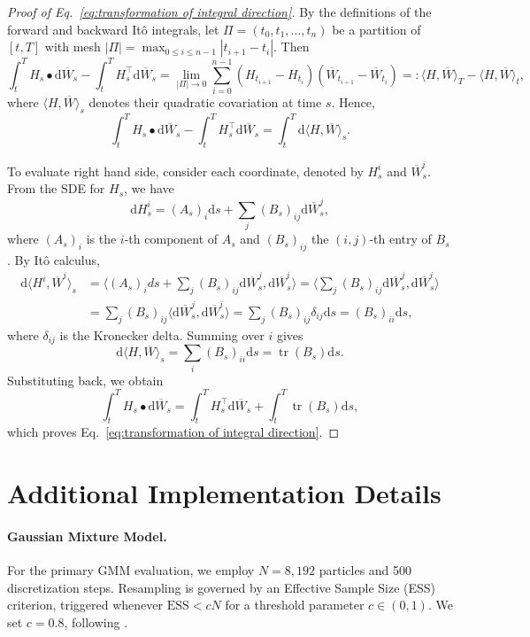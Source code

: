 \documentclass{article}
\theoremstyle{plain}
\theoremstyle{definition}
\theoremstyle{remark}
\newcommand{\dif}{{\mathrm{d}}}
\begin{document}
\begin{proof}[Proof of Eq.~\eqref{eq:transformation of integral direction}]
By the definitions of the forward and backward Itô integrals, let \(\Pi=(t_0,t_1,\ldots,t_n)\) be a partition of \([t,T]\) with mesh \(|\Pi|=\max_{0\le i\le n-1}|t_{i+1}-t_i|\). Then
\[
\int_t^T H_s\bullet \dif \overline W_s-\int_t^T H_s^\top \dif \overline W_s
=\lim_{|\Pi|\to 0}\sum_{i=0}^{n-1}(H_{t_{i+1}}-H_{t_i})(\overline W_{t_{i+1}}-\overline W_{t_i})
=:\langle H,\overline W\rangle_T-\langle H,\overline W\rangle_t,
\]
where \(\langle H,\overline W\rangle_s\) denotes their quadratic covariation at time \(s\).
Hence,
\[
\int_t^T H_s\bullet \dif \overline W_s - \int_t^T H_s^\top \dif \overline W_s
= \int_t^T \dif \langle H, \overline W\rangle_s.
\]

To evaluate right hand side, consider each coordinate, denoted by $H_s^i$ and $\overline W_s^i$.  
From the SDE for $H_s$, we have
\[
\dif H_s^i = (A_s)_i \dif s + \sum_j (B_s)_{ij} \dif \overline W_s^j,
\]
where $(A_s)_i$ is the $i$-th component of $A_s$ and $(B_s)_{ij}$ the $(i,j)$-th entry of $B_s$. By Itô calculus,
\begin{align*}
\dif \langle H^i, \overline W^i\rangle_s
&= \Big\langle (A_s)_i ds + \sum_j (B_s)_{ij} \dif \overline W_s^j, \dif \overline W_s^i \Big\rangle
= \Big\langle \sum_j (B_s)_{ij} \dif \overline W_s^j, \dif \overline W_s^i \Big\rangle \\
&= \sum_j (B_s)_{ij} \langle \dif \overline W_s^j, \dif \overline W_s^i \rangle
= \sum_j (B_s)_{ij} \delta_{ij} \dif s
= (B_s)_{ii} \dif s,
\end{align*}
where $\delta_{ij}$ is the Kronecker delta. Summing over $i$ gives
\[
\dif \langle H, \overline W\rangle_s = \sum_i (B_s)_{ii} \dif s = \operatorname{tr}(B_s) \dif s.
\]
Substituting back, we obtain
\[
\int_t^T H_s\bullet \dif \overline W_s
= \int_t^T H_s^\top \dif \overline W_s + \int_t^T \operatorname{tr}(B_s) \dif s,
\]
which proves Eq.~\eqref{eq:transformation of integral direction}.
\end{proof}

\section{Additional Implementation Details}
\label{additional_set}

\paragraph{Gaussian Mixture Model.} For the primary GMM evaluation, we employ $N=8,192$ particles and 500 discretization steps. Resampling is governed by an Effective Sample Size (ESS) criterion, triggered whenever $\mathrm{ESS} < cN$ for a threshold parameter $c \in (0, 1)$. We set $c=0.8$, following \cite{ren2025driftlite}.
\end{document}
